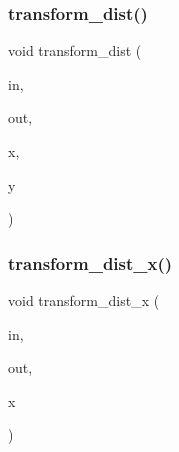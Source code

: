 \mbox{\label{draw_8_c_af89c2846dfb8109ed5b64389d5c0c1c1}} 
\subsubsection{\texorpdfstring{transform\+\_\+dist()}{transform\_dist()}}
{\footnotesize\ttfamily void transform\+\_\+dist (\begin{DoxyParamCaption}\item[{\mbox{\hyperlink{galois_8h_a09fddde158a3a20bd2dcadb609de11dc}{I\+NT}} $\ast$}]{in,  }\item[{\mbox{\hyperlink{galois_8h_a09fddde158a3a20bd2dcadb609de11dc}{I\+NT}} $\ast$}]{out,  }\item[{\mbox{\hyperlink{galois_8h_a09fddde158a3a20bd2dcadb609de11dc}{I\+NT}} \&}]{x,  }\item[{\mbox{\hyperlink{galois_8h_a09fddde158a3a20bd2dcadb609de11dc}{I\+NT}} \&}]{y }\end{DoxyParamCaption})}

\mbox{\label{draw_8_c_ae3c6c150bc6ef27101af4a6eb7e5b33a}} 
\subsubsection{\texorpdfstring{transform\+\_\+dist\+\_\+x()}{transform\_dist\_x()}}
{\footnotesize\ttfamily void transform\+\_\+dist\+\_\+x (\begin{DoxyParamCaption}\item[{\mbox{\hyperlink{galois_8h_a09fddde158a3a20bd2dcadb609de11dc}{I\+NT}} $\ast$}]{in,  }\item[{\mbox{\hyperlink{galois_8h_a09fddde158a3a20bd2dcadb609de11dc}{I\+NT}} $\ast$}]{out,  }\item[{\mbox{\hyperlink{galois_8h_a09fddde158a3a20bd2dcadb609de11dc}{I\+NT}} \&}]{x }\end{DoxyParamCaption})}

\mbox{\label{draw_8_c_ae46284a191040d40ad4dcdb22835dc41}} 

